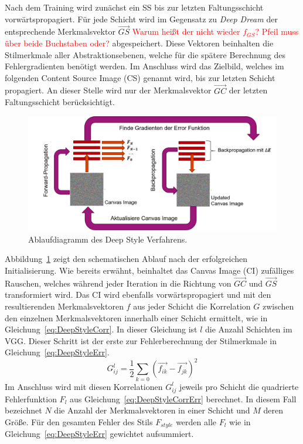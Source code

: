 \documentclass[times, 11pt,twocolumn]{article}
\begin{document}
Nach dem Training wird zunächst ein SS bis zur letzten Faltungsschicht vorwärtspropagiert. Für jede Schicht wird im Gegensatz zu \textit{Deep Dream} der entsprechende Merkmalsvektor $\vec{GS}$ \textcolor{red}{Warum heißt der nicht wieder $f_{GS}$? Pfeil muss über beide Buchstaben oder?} abgespeichert. Diese Vektoren beinhalten die Stilmerkmale aller Abstraktionsebenen, welche für die spätere Berechnung des Fehlergradienten benötigt werden. Im Anschluss wird das Zielbild, welches im folgenden Content Source Image (CS) genannt wird, bis zur letzten Schicht propagiert. An dieser Stelle wird nur der Merkmalsvektor $\vec{GC}$ der letzten Faltungsschicht berücksichtigt.

\begin{figure}
	\flushleft
	\includegraphics[width=\columnwidth]{Bilder/DeepStyle.jpg}
	\caption{Ablaufdiagramm des Deep Style Verfahrens.}
	\label{fig:DeepStyle}
\end{figure}
Abbildung~\ref{fig:DeepStyle} zeigt den schematischen Ablauf nach der erfolgreichen Initialisierung. Wie bereits erwähnt, beinhaltet das Canvas Image (CI) zufälliges Rauschen, welches während jeder Iteration in die Richtung von $\vec{GC}$ und $\vec{GS}$ transformiert wird. Das CI wird ebenfalls vorwärtspropagiert und mit den resultierenden Merkmalsvektoren $f$ aus jeder Schicht die Korrelation $G$ zwischen den einzelnen Merkmalsvektoren innerhalb einer Schicht ermittelt, wie in Gleichung~\ref{eq:DeepStyleCorr}. In dieser Gleichung ist $l$ die Anzahl Schichten im VGG. Dieser Schritt ist der erste zur Fehlerberechnung der Stilmerkmale in Gleichung~\ref{eq:DeepStyleErr}.
\footnotesize
\begin{equation}
G_{ij}^l= \frac{1}{2}\sum_{k=0} (\vec{f_{ik}}- \vec{f_{jk}})^2
\label{eq:DeepStyleCorr}
\end{equation}
\small
Im Anschluss wird mit diesen Korrelationen $G_{ij}^l$ jeweils pro Schicht die quadrierte Fehlerfunktion $F_l$ aus Gleichung~\ref{eq:DeepStyleCorrErr} berechnet. In diesem Fall bezeichnet $N$ die Anzahl der Merkmalsvektoren in einer Schicht und $M$ deren Größe. Für den gesamten Fehler des Stils $F_{style}$ werden alle $F_l$ wie in Gleichung~\ref{eq:DeepStyleErr} gewichtet aufsummiert.
\end{document}

